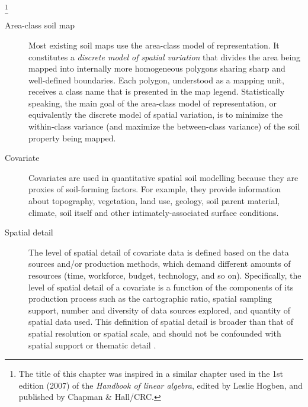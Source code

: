 
\footnote{The title of this chapter was inspired in a similar chapter used in the 1st edition 
(2007) of the \emph{Handbook of linear algebra}, edited by Leslie Hogben, and published by Chapman 
\& Hall/CRC.}

\begin{description}
 \item[Area-class soil map] Most existing soil maps use the area-class model of representation. It 
 constitutes a \emph{discrete model of spatial variation} that divides the area being mapped into 
 internally more homogeneous polygons sharing sharp and well-defined boundaries. Each polygon, 
 understood as a mapping unit, receives a class name that is presented in the map legend. 
 Statistically speaking, the main goal of the area-class model of representation, or equivalently 
 the discrete model of spatial variation, is to minimize the within-class variance (and maximize 
 the between-class variance) of the soil property being mapped.
 
 \item[Covariate] Covariates are used in quantitative spatial soil modelling because they are 
 proxies of soil-forming factors. For example, they provide information about topography, 
 vegetation, land use, geology, soil parent material, climate, soil itself and other 
 intimately-associated surface conditions.
 
 \item[Spatial detail] The level of spatial detail of covariate data is defined based on the data 
 sources and/or production methods, which demand different amounts of resources (time, workforce, 
 budget, technology, and so on). Specifically, the level of spatial detail of a covariate is a 
 function of the components of its production process such as the cartographic ratio, spatial 
 sampling support, number and diversity of data sources explored, and quantity of spatial data used. 
 This definition of spatial detail is broader than that of spatial resolution or spatial scale, and 
 should not be confounded with spatial support \cite{WebsterEtAl2007} or thematic detail 
 \cite{Rossiter2000}.
\end{description}